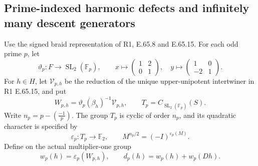 \subsection{Prime-indexed harmonic defects and infinitely many descent generators}

Use the signed braid representation of R1, E.65.8 and E.65.15.
For each odd prime $p$, let
\[
 \vartheta_p:F\longrightarrow\operatorname{SL}_2(\mathbb F_p),
 \qquad x\longmapsto
 \begin{pmatrix}1&2\\0&1\end{pmatrix},\quad
 y\longmapsto\begin{pmatrix}1&0\\-2&1\end{pmatrix}.
 \tag{B.AC1}
\]
For $h\in H$, let $\mathcal V_{p,h}$ be the reduction of
the unique upper-unipotent intertwiner in R1 E.65.15, and put
\[
 W_{p,h}=\vartheta_p(\beta_h)^{-1}\mathcal V_{p,h},\qquad
 T_p=C_{\operatorname{SL}_2(\mathbb F_p)}(S).
 \tag{B.AC2}
\]
Write $n_p=p-\left(\frac{-1}{p}\right)$.  The group $T_p$ is
cyclic of order $n_p$, and its quadratic character is specified by
\[
 \varepsilon_p:T_p\longrightarrow\mathbb F_2,\qquad
             M^{n_p/2}=(-I)^{\varepsilon_p(M)}.
 \tag{B.AC3}
\]
Define on the actual multiplier-one group
\[
 w_p(h)=\varepsilon_p(W_{p,h}),\qquad
                   d_p(h)=w_p(h)+w_p(Dh).
 \tag{B.AC4}
\]

